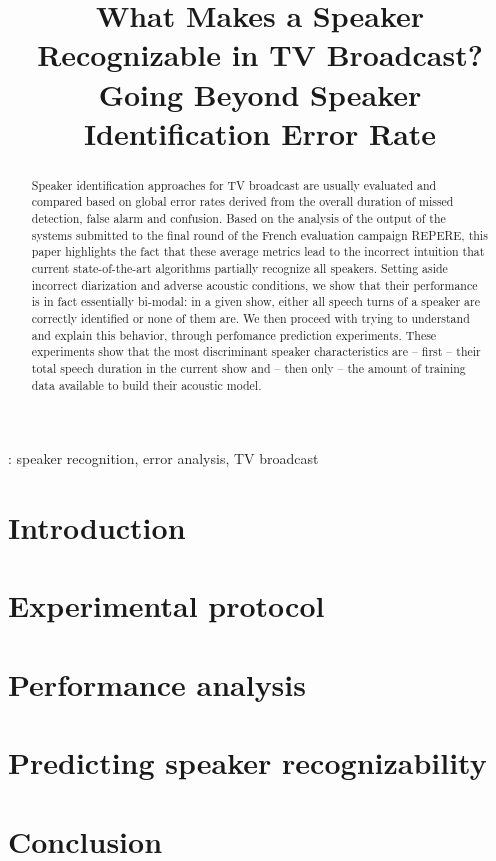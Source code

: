 \documentclass[a4paper]{article}
\title{What Makes a Speaker Recognizable in TV Broadcast?\\
Going Beyond Speaker Identification Error Rate}
\begin{document}
\maketitle

\begin{abstract}
\vspace*{-0.2cm}
Speaker identification approaches for TV broadcast are usually evaluated and compared based on global error rates derived from the overall duration of missed detection, false alarm and confusion.
Based on the analysis of the output of the systems submitted to the final round of the French evaluation campaign REPERE, this paper highlights the fact that these average metrics lead to the incorrect intuition that current state-of-the-art algorithms partially recognize all speakers. Setting aside incorrect diarization and adverse acoustic conditions, we show that their performance is in fact essentially bi-modal: in a given show, either all speech turns of a speaker are correctly identified or none of them are. We then proceed with trying to understand and explain this behavior, through perfomance prediction experiments. These experiments show that the most discriminant speaker characteristics are -- first -- their total speech duration in the current show and -- then only -- the amount of training data available to build their acoustic model.
\end{abstract}

: speaker recognition, error analysis, TV broadcast

\section{Introduction}
\label{sec:introduction}


\vspace*{-0.4cm}
\section{Experimental protocol}
\label{sec:protocol}


\section{Performance analysis}
\label{sec:analysis}


\section{Predicting speaker recognizability}
\label{sec:prediction}



\section{Conclusion}
\label{sec:conclusion}



\newpage
\eightpt



\end{document}
